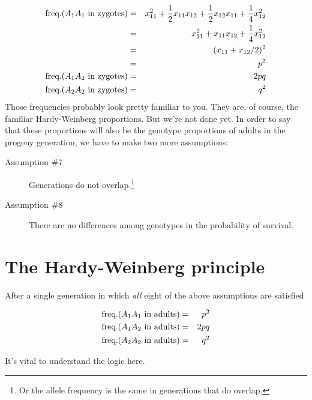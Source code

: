 \begin{eqnarray*}
\hbox{freq.}(A_1A_1\hbox{ in zygotes}) &=&
   x_{11}^2 + \frac{1}{2}x_{11}x_{12} + \frac{1}{2}x_{12}x_{11}
   + \frac{1}{4}x_{12}^2 \\
&=& x_{11}^2 + x_{11}x_{12} + \frac{1}{4}x_{12}^2 \\
&=& (x_{11} + x_{12}/2)^2 \\
&=& p^2 \\
\hbox{freq.}(A_1A_2\hbox{ in zygotes}) &=& 2pq \\
\hbox{freq.}(A_2A_2\hbox{ in zygotes}) &=& q^2 \\
\end{eqnarray*}
Those frequencies probably look pretty familiar to you. They are, of
course, the familiar Hardy-Weinberg proportions. But we're not done
yet. In order to say that these proportions will also be the genotype
proportions of adults in the progeny generation, we have to make two
more assumptions:

\begin{description}

\item[Assumption \#7] Generations do not overlap.\footnote{Or the
    allele frequency is the same in generations that do overlap.}

\item[Assumption \#8] There are no differences among genotypes in the
probability of survival.

\end{description}

\section*{The Hardy-Weinberg principle}

After a single generation in which {\it all\/} eight of the above
assumptions are satisfied

\begin{eqnarray}
\hbox{freq.}(A_1A_1\hbox{ in adults}) &=& p^2 \label{eq:hw-p2} \\
\hbox{freq.}(A_1A_2\hbox{ in adults}) &=& 2pq \label{eq:hw-2pq} \\
\hbox{freq.}(A_2A_2\hbox{ in adults}) &=& q^2 \label{eq:hw-q2}
\end{eqnarray}

\noindent It's vital to understand the logic here.

